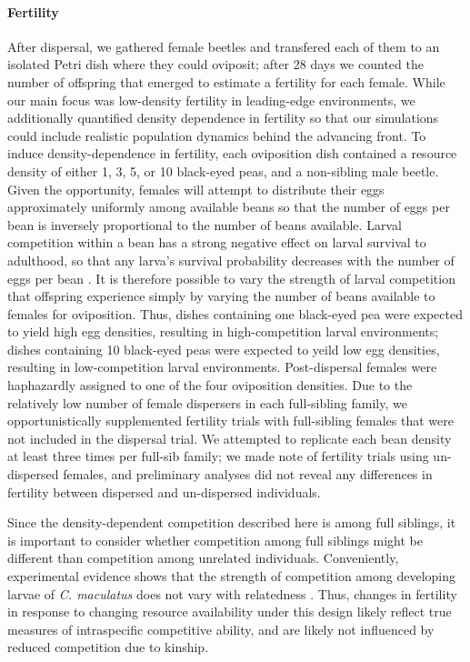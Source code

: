 \documentclass[11pt]{article}
\begin{document}
\paragraph{Fertility}
After dispersal, we gathered female beetles and transfered each of them to an isolated Petri dish where they could oviposit; after 28 days we counted the number of offspring that emerged to estimate a fertility for each female.
While our main focus was low-density fertility in leading-edge environments, we additionally quantified density dependence in fertility so that our simulations could include realistic population dynamics behind the advancing front.
To induce density-dependence in fertility, each oviposition dish contained a resource density of either 1, 3, 5, or 10 black-eyed peas, and a non-sibling male beetle.
Given the opportunity, females will attempt to distribute their eggs approximately uniformly among available beans \citep{fujii_behavioral_1990} so that the number of eggs per bean is inversely proportional to the number of beans available.
Larval competition within a bean has a strong negative effect on larval survival to adulthood, so that any larva's survival probability decreases with the number of eggs per bean \citep{giga_intraspecific_1991}.
It is therefore possible to vary the strength of larval competition that offspring experience simply by varying the number of beans available to females for oviposition.
Thus, dishes containing one black-eyed pea were expected to yield high egg densities, resulting in high-competition larval environments; dishes containing 10 black-eyed peas were expected to yeild low egg densities, resulting in low-competition larval environments.
Post-dispersal females were haphazardly assigned to one of the four oviposition densities.
Due to the relatively low number of female dispersers in each full-sibling family, we opportunistically supplemented fertility trials with full-sibling females that were not included in the dispersal trial.
We attempted to replicate each bean density at least three times per full-sib family; we made note of fertility trials using un-dispersed females, and preliminary analyses did not reveal any differences in fertility between dispersed and un-dispersed individuals.

Since the density-dependent competition described here is among full siblings, it is important to consider whether competition among full siblings might be different than competition among unrelated individuals.
Conveniently, experimental evidence shows that the strength of competition among developing larvae of \textit{C. maculatus} does not vary with relatedness \citep{smallegange_local_2008}.
Thus, changes in fertility in response to changing resource availability under this design likely reflect true measures of intraspecific competitive ability, and are likely not influenced by reduced competition due to kinship.
\end{document}
